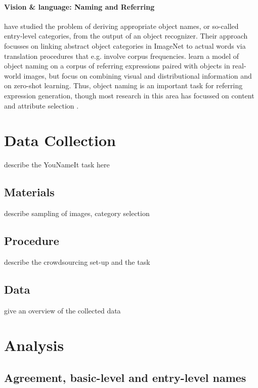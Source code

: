 \documentclass[11pt]{article}
\begin{document}
\paragraph{Vision \& language: Naming and Referring}

 have studied the problem of deriving appropriate object names, or so-called entry-level
 categories, from the output of an object recognizer. Their approach focusses on linking abstract object categories in ImageNet to actual words via translation procedures that e.g. involve corpus frequencies. 
  learn a model of object naming on a corpus of referring expressions paired with objects in real-world images, but focus on combining visual and distributional information and on zero-shot learning.
 Thus, object naming is an important task for referring expression generation, though most research in this area has focussed on content and attribute selection \cite{Kazemzadeh2014,gkatzia:2015,zarrieschlang:easy-pre,Maoetal:cocorefexp}.





\section{Data Collection}
\label{sec:task}

describe the YouNameIt task here

\subsection{Materials} describe sampling of images, category selection

\subsection{Procedure} describe the crowdsourcing set-up and the task

\subsection{Data} give an overview of the collected data


\section{Analysis}

\subsection{Agreement, basic-level and entry-level names}
\end{document}
